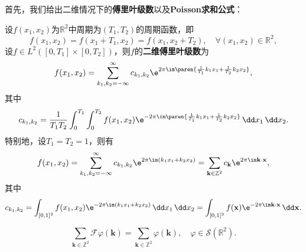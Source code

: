 首先，我们给出二维情况下的\textbf{傅里叶级数}以及\textbf{Poisson求和公式}：
\begin{definition}[二维傅里叶级数]
    设$f(x_1,x_2)$为$\mathbb{R}^2$中周期为$(T_1,T_2)$的周期函数，即
    \begin{equation}
        f(x_1,x_2)=f(x_1+T_1,x_2)=f(x_1,x_2+T_2),\quad \forall(x_1,x_2)\in\mathbb{R}^2,
    \end{equation}
    设$f\in L^2([0,T_1]\times[0,T_2])$，则$f$的\textbf{二维傅里叶级数}为
    \begin{equation}
        f(x_1,x_2)=\sum_{k_1,k_2=-\infty}^{\infty}c_{k_1,k_2}\e^{2\pi\im\paren{\frac{1}{T_1}k_1 x_1+\frac{1}{T_2}k_2 x_2}},
    \end{equation}
    其中
    \begin{equation}
        c_{k_1,k_2}=\frac{1}{T_1 T_2}\int_0^{T_1}\int_0^{T_2}f(x_1,x_2)\e^{-2\pi\im\paren{\frac{1}{T_1}k_1 x_1+\frac{1}{T_2}k_2 x_2}}\,\dd x_1\,\dd x_2.
    \end{equation}
    特别地，设$T_1=T_2=1$，则有
    \begin{equation}
        f(x_1,x_2)=\sum_{k_1,k_2=-\infty}^{\infty}c_{k_1,k_2}\e^{2\pi\im(k_1 x_1+k_2 x_2)}=\sum_{\mathbf{k}\in\mathbb{Z}^2}c_{\mathbf{k}}\e^{2\pi\im\mathbf{k}\cdot\mathbf{x}},
    \end{equation}
    其中
    \begin{equation}
        c_{k_1,k_2}=\int_{[0,1]^2}f(x_1,x_2)\e^{-2\pi\im(k_1 x_1+k_2 x_2)}\,\dd x_1\,\dd x_2=\int_{[0,1]^2}f(\mathbf{x})\e^{-2\pi\im\mathbf{k}\cdot\mathbf{x}}\,\dd\mathbf{x}.
    \end{equation}
\end{definition}
\begin{theorem}[二维Poisson求和公式]
    \begin{equation}
        \sum_{\mathbf{k}\in\mathbb{Z}^2}\mathcal{F}\varphi(\mathbf{k})=\sum_{\mathbf{k}\in\mathbb{Z}^2}\varphi(\mathbf{k}),\quad \varphi\in\mathcal{S}(\mathbb{R}^2).
    \end{equation}
\end{theorem}
